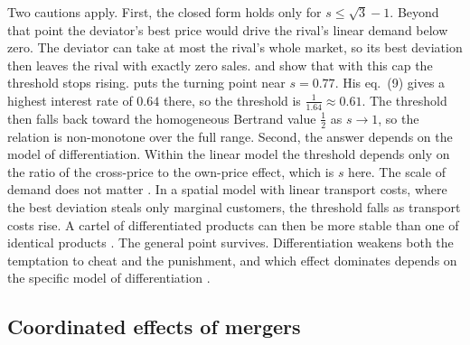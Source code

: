 Two cautions apply. First, the closed form holds only for $s \le \sqrt 3 - 1$. Beyond that point the deviator's best
price would drive the rival's linear demand below zero. The deviator can take at most the rival's whole market, so
its best deviation then leaves the rival with exactly zero sales. \citet[pp.~40--42]{Deneckere1983} and
\citet[p.~7]{Ross1992} show that with this cap the threshold stops rising. \citet[p.~7]{Ross1992} puts the turning
point near $s = 0.77$. His eq.~(9) gives a highest interest rate of $0.64$ there, so the threshold is
$\frac{1}{1.64} \approx 0.61$. The threshold then falls back toward the homogeneous Bertrand value $\frac{1}{2}$
as $s \to 1$, so the relation is non-monotone over the full range. Second, the answer depends on the model of differentiation. Within the linear
model the threshold depends only on the ratio of the cross-price to the own-price effect, which is $s$ here. The
scale of demand does not matter \citep[p.~7]{Ross1992}. In a spatial model with linear transport costs, where the best
deviation steals only marginal customers, the threshold falls as transport costs rise. A cartel of differentiated
products can then be more stable than one of identical products \citep[pp.~8--11]{Ross1992}.
The general point survives. Differentiation weakens both the temptation to cheat and the punishment, and which effect
dominates depends on the specific model of differentiation \citep[p.~5]{Ross1992}.

\subsection{Coordinated effects of mergers}\label{sec:12-coordinated}

